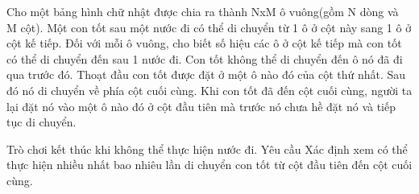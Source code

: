 Cho một bảng hình chữ nhật được chia ra thành NxM ô vuông(gồm N dòng và M cột). Một con tốt sau một nước đi có thể di chuyển từ 1 ô ở cột này sang 1 ô ở cột kế tiếp. Đối với mỗi ô vuông, cho biết số hiệu các ô ở cột kế tiếp mà con tốt có thể di chuyển đến sau 1 nước đi. Con tốt không thể di chuyển đến ô nó đã đi qua trước đó. Thoạt đầu con tốt được đặt ở một ô nào đó của cột thứ nhất. Sau đó nó di chuyển về phía cột cuối cùng. Khi con tốt đã đến cột cuối cùng, người ta lại đặt nó vào một ô nào đó ở cột đầu tiên mà trước nó chưa hề đặt nó và tiếp tục di chuyển.  

   Trò chơi kết thúc khi không thể thực hiện nước đi.
   Yêu cầu  
Xác định xem có thể thực hiện nhiều nhất bao nhiêu lần di chuyển con tốt từ cột đầu tiên đến cột cuối cùng.